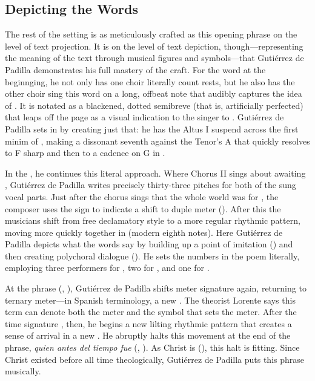 \subsection{Depicting the Words}

The rest of the setting is as meticulously crafted as this opening phrase on the
level of text projection.
It is on the level of text depiction, though---representing the meaning of the
text through musical figures and symbols---that Gutiérrez de Padilla
demonstrates his full mastery of the craft.
For the word  at the beginnging, he not only has one choir
literally count rests, but he also has the other choir sing this word on a
long, offbeat note that audibly captures the idea of .
It is notated as a blackened, dotted semibreve (that is, artificially perfected)
that leaps off the page as a visual indication to the singer to .
Gutiérrez de Padilla sets  in 
by creating just that: he has the Altus I suspend across the first minim of
, making a dissonant seventh against the Tenor's A that quickly
resolves to F sharp and then to a cadence on G in .

In the , he continues this literal approach.
Where Chorus II sings about awaiting , Gutiérrez de
Padilla writes precisely thirty-three pitches for both of the sung vocal parts.
Just after the chorus sings that the whole world was  for
, the composer uses the \meterC{} sign to indicate a shift to
duple meter ().
After this the musicians shift from free declamatory style to a more regular
rhythmic pattern, moving more quickly together in  (modern
eighth notes).%
    \Autocite
    [This is the term used by Cerone and villancico poets (see  in \cref{ch:zaragoza}):]
    [\XXX]
    {Cerone:Melopeo}
Here Gutiérrez de Padilla depicts what the words say by building up a point of
imitation  () and then
creating polychoral dialogue ().
He sets the numbers in the poem literally, employing three performers for
, two for , and one for .

At the phrase  (, ), Gutiérrez de Padilla shifts meter signature
again, returning to ternary meter---in Spanish terminology, a new .
The theorist Lorente says this term can denote both the meter and the symbol
that sets the meter.%
    \Autocite[, 149]{Lorente:Porque}
After the time signature \meterCZ, then, he begins a new lilting rhythmic
pattern that creates a sense of arrival in a new .
He abruptly halts this movement at the end of the phrase, \emph{quien antes del
tiempo fue} (, ).
As Christ is  (), this halt is
fitting.
Since Christ existed before all time theologically, Gutiérrez de Padilla puts
this phrase  musically.

